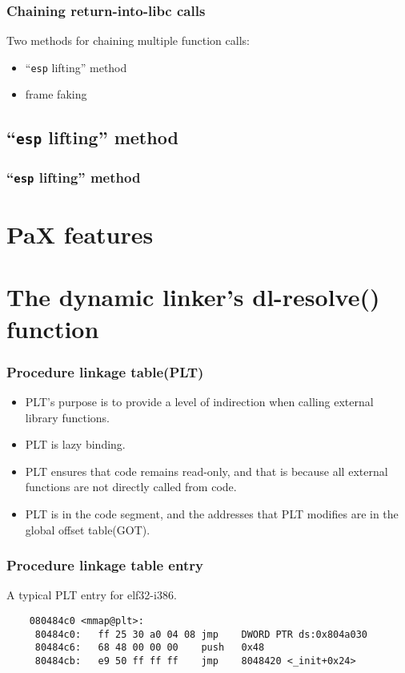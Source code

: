 \documentclass{beamer}
\begin{document}
\begin{frame}
  \frametitle{Chaining return-into-libc calls}
  Two methods for chaining multiple function calls:
  \begin{itemize}
    \item ``\texttt{esp} lifting'' method
    \item frame faking
  \end{itemize}
\end{frame}

\subsection{``\texttt{esp} lifting'' method}

\begin{frame}
  \frametitle{``\texttt{esp} lifting'' method}

\end{frame}


\section{PaX features}  %





\section{The dynamic linker's dl-resolve() function}  %

\begin{frame}[fragile]
\frametitle{Procedure linkage table(PLT)}

 \begin{itemize}
    \item PLT's purpose is to provide a level of indirection when calling external library functions.
    \item PLT is lazy binding.
    \item PLT ensures that code remains read-only, and that is because all external functions are not directly called from code.
    \item PLT is in the code segment, and the addresses that PLT modifies are in the global offset table(GOT).
  \end{itemize}

\end{frame}

\begin{frame}[fragile]
\frametitle{Procedure linkage table entry}
A typical PLT entry for elf32-i386.
	\begin{verbatim}
	080484c0 <mmap@plt>:
	 80484c0:	ff 25 30 a0 04 08 jmp    DWORD PTR ds:0x804a030
	 80484c6:	68 48 00 00 00    push   0x48
	 80484cb:	e9 50 ff ff ff    jmp    8048420 <_init+0x24>
	\end{verbatim}


\end{frame}
\end{document}
